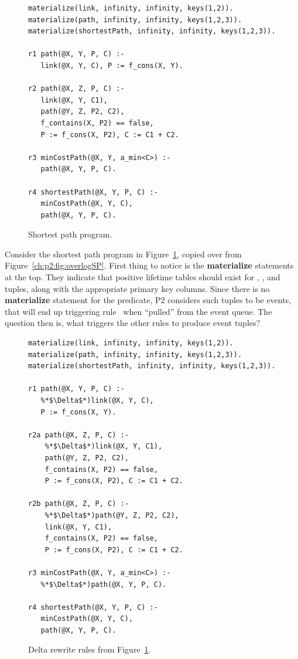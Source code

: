 \begin{figure}
\ssp
\centering
\begin{lstlisting}
materialize(link, infinity, infinity, keys(1,2)).
materialize(path, infinity, infinity, keys(1,2,3)).
materialize(shortestPath, infinity, infinity, keys(1,2,3)).
  
r1 path(@X, Y, P, C) :- 
   link(@X, Y, C), P := f_cons(X, Y).

r2 path(@X, Z, P, C) :-
   link(@X, Y, C1), 
   path(@Y, Z, P2, C2),
   f_contains(X, P2) == false,
   P := f_cons(X, P2), C := C1 + C2.

r3 minCostPath(@X, Y, a_min<C>) :-
   path(@X, Y, P, C).

r4 shortestPath(@X, Y, P, C) :-
   minCostPath(@X, Y, C), 
   path(@X, Y, P, C).

\end{lstlisting}
\caption{\label{ch:evita:fig:basicSP}Shortest path program.}
\end{figure}

Consider the shortest path program in Figure~\ref{ch:evita:fig:basicSP}, copied
over from Figure~\ref{ch:p2:fig:overlogSP}.  First thing to notice is the {\bf
materialize} statements at the top.  They indicate that positive lifetime
tables should exist for , , and  tuples,
along with the appropriate primary key columns.  Since there is no {\bf
materialize} statement for the  predicate, P2 considers such
tuples to be events, that will end up triggering rule~ when ``pulled''
from the event queue.  The question then is, what triggers the other rules to
produce  event tuples?

\begin{figure}
\ssp
\centering
\begin{lstlisting}
materialize(link, infinity, infinity, keys(1,2)).
materialize(path, infinity, infinity, keys(1,2,3)).
materialize(shortestPath, infinity, infinity, keys(1,2,3)).

r1 path(@X, Y, P, C) :-
   %*$\Delta$*)link(@X, Y, C), 
   P := f_cons(X, Y).

r2a path(@X, Z, P, C) :-
    %*$\Delta$*)link(@X, Y, C1), 
    path(@Y, Z, P2, C2),
    f_contains(X, P2) == false,
    P := f_cons(X, P2), C := C1 + C2.

r2b path(@X, Z, P, C) :-
    %*$\Delta$*)path(@Y, Z, P2, C2), 
    link(@X, Y, C1),
    f_contains(X, P2) == false,
    P := f_cons(X, P2), C := C1 + C2.

r3 minCostPath(@X, Y, a_min<C>) :-
   %*$\Delta$*)path(@X, Y, P, C).

r4 shortestPath(@X, Y, P, C) :-
   minCostPath(@X, Y, C), 
   path(@X, Y, P, C).
\end{lstlisting}
\caption{\label{ch:evita:fig:basicSPDelta}Delta rewrite rules from Figure~\ref{ch:evita:fig:basicSP}.}
\end{figure}

